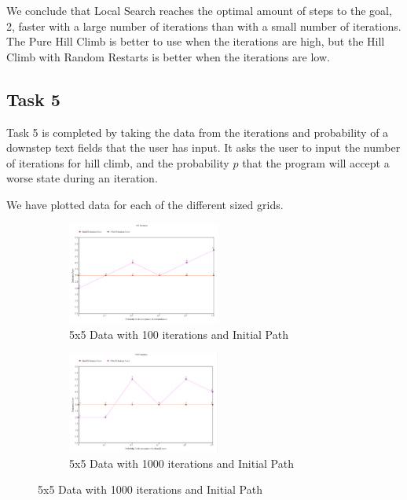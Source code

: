\documentclass[11pt, oneside]{article}   	%
\begin{document}
We conclude that Local Search reaches the optimal amount of steps to the goal, 2, faster with a large number of iterations than with a small number of iterations. The Pure Hill Climb is better to use when the iterations are high, but the Hill Climb with Random Restarts is better when the iterations are low.

\subsection{Task 5}
Task 5 is completed by taking the data from the iterations and probability of a downstep text fields that the user has input. It asks the user to input the number of iterations for hill climb, and the probability $p$ that the program will accept a worse state during an iteration.

We have plotted data for each of the different sized grids.

\begin{figure}[H]
\centering
\begin{subfigure}{.5\textwidth}
	\centering
	\includegraphics[width=50mm]{5x5down.png}
	\caption{5x5 Data with 100 iterations and Initial Path}
	\label{fig:method}
\end{subfigure}%
\begin{subfigure}{.5\textwidth}
	\centering
	\includegraphics[width=50mm]{5x5down2.png}
	\caption{5x5 Data with 1000 iterations and Initial Path}
	\label{fig:method}
\end{subfigure}
\end{figure}
\end{document}
